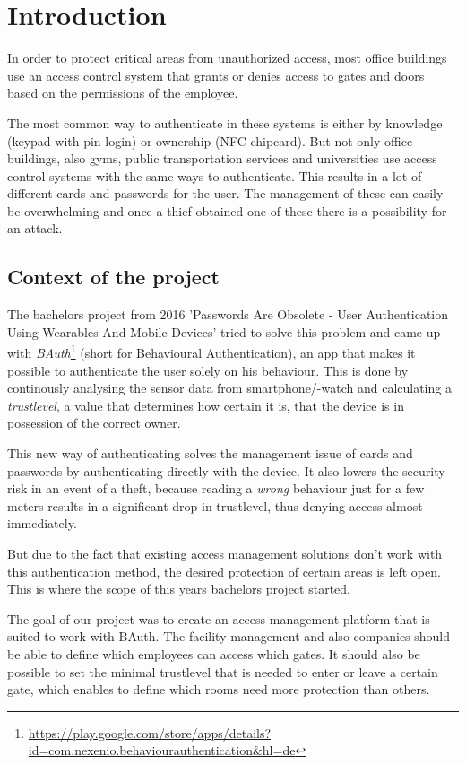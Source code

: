 \section{Introduction}

In order to protect critical areas from unauthorized access, most office buildings use an access control system that grants or denies access to gates and doors based on the permissions of the employee.

The most common way to authenticate in these systems is either by knowledge (keypad with pin login) or ownership (NFC chipcard).
But not only office buildings, also gyms, public transportation services and universities use access control systems with the same ways to authenticate. This results in a lot of different cards and passwords for the user. The management of these can easily be overwhelming and once a thief obtained one of these there is a possibility for an attack.

\subsection{Context of the project}
\label{Context of the project}

The bachelors project from 2016 'Passwords Are Obsolete - User Authentication Using Wearables And Mobile Devices' tried to solve this problem and came up with \emph{BAuth}\footnote{\url{https://play.google.com/store/apps/details?id=com.nexenio.behaviourauthentication&hl=de}} (short for Behavioural Authentication), an app that makes it possible to authenticate the user solely on his behaviour. This is done by continously analysing the sensor data from smartphone/-watch and calculating a \emph{trustlevel}, a value that determines how certain it is, that the device is in possession of the correct owner.

This new way of authenticating solves the management issue of cards and passwords by authenticating directly with the device. It also lowers the security risk in an event of a theft, because reading a \emph{wrong} behaviour just for a few meters results in a significant drop in trustlevel, thus denying access almost immediately.

But due to the fact that existing access management solutions don't work with this authentication method, the desired protection of certain areas is left open. This is where the scope of this years bachelors project started. 

The goal of our project was to create an access management platform that is suited to work with BAuth. The facility management and also companies should be able to define which employees can access which gates. It should also be possible to set the minimal trustlevel that is needed to enter or leave a certain gate, which enables to define which rooms need more protection than others.

